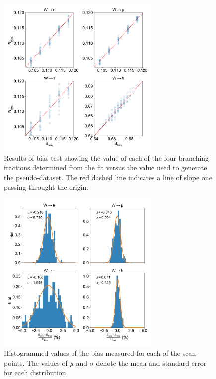 \begin{figure}[htb!]
    \centering
    \includegraphics[width=0.7\textwidth]{chapters/Analysis/sectionStatisticalAnalysis/figures/beta_scan}
    \caption{Results of bias test showing the value of each of the four branching fractions determined from the fit versus the value used to generate the pseudo-dataset.  The red dashed line indicates a line of slope one passing throught the origin.}
    \label{fig:analysis:method:mle:bias_scan}
\end{figure}

\begin{figure}[htb!]
    \centering
    \includegraphics[width=0.7\textwidth]{chapters/Analysis/sectionStatisticalAnalysis/figures/beta_bias}
    \caption{Histogrammed values of the bias measured for each of the scan points.  The values of $\mu$ and $\sigma$ denote the mean and standard error for each distribution.}
    \label{fig:analysis:method:mle:bias_test}
\end{figure}

